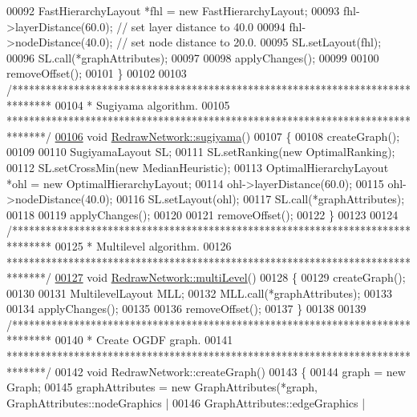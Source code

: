 \begin{DoxyCode}
00092   FastHierarchyLayout *fhl = \textcolor{keyword}{new} FastHierarchyLayout;
00093   fhl->layerDistance(60.0);    \textcolor{comment}{// set layer distance to 40.0}
00094   fhl->nodeDistance(40.0); \textcolor{comment}{// set node distance to 20.0.}
00095   SL.setLayout(fhl);
00096   SL.call(*graphAttributes);
00097 
00098   applyChanges();
00099 
00100   removeOffset();
00101 \}
00102 
00103 \textcolor{comment}{/*******************************************************************************}
00104 \textcolor{comment}{* Sugiyama algorithm.}
00105 \textcolor{comment}{*******************************************************************************/}
\hypertarget{redrawnetwork_8cpp_source_l00106}{}\hyperlink{group___algorithms_gaee0ae606982145e66bba825421d610f8}{00106} \textcolor{keywordtype}{void} \hyperlink{group___algorithms_gaee0ae606982145e66bba825421d610f8}{RedrawNetwork::sugiyama}()
00107 \{
00108   createGraph();
00109 
00110   SugiyamaLayout SL;
00111   SL.setRanking(\textcolor{keyword}{new} OptimalRanking);
00112   SL.setCrossMin(\textcolor{keyword}{new} MedianHeuristic);
00113   OptimalHierarchyLayout *ohl = \textcolor{keyword}{new} OptimalHierarchyLayout;
00114   ohl->layerDistance(60.0);
00115   ohl->nodeDistance(40.0);
00116   SL.setLayout(ohl);
00117   SL.call(*graphAttributes);
00118 
00119   applyChanges();
00120 
00121   removeOffset();
00122 \}
00123 
00124 \textcolor{comment}{/*******************************************************************************}
00125 \textcolor{comment}{* Multilevel algorithm.}
00126 \textcolor{comment}{*******************************************************************************/}
\hypertarget{redrawnetwork_8cpp_source_l00127}{}\hyperlink{group___algorithms_ga56a92ad06ae0198ee60160aa66aa0ce1}{00127} \textcolor{keywordtype}{void} \hyperlink{group___algorithms_ga56a92ad06ae0198ee60160aa66aa0ce1}{RedrawNetwork::multiLevel}()
00128 \{
00129   createGraph();
00130 
00131   MultilevelLayout MLL;
00132   MLL.call(*graphAttributes);
00133 
00134   applyChanges();
00135 
00136   removeOffset();
00137 \}
00138 
00139 \textcolor{comment}{/*******************************************************************************}
00140 \textcolor{comment}{* Create OGDF graph.}
00141 \textcolor{comment}{*******************************************************************************/}
00142 \textcolor{keywordtype}{void} RedrawNetwork::createGraph()
00143 \{
00144   graph = \textcolor{keyword}{new} Graph;
00145   graphAttributes = \textcolor{keyword}{new} GraphAttributes(*graph, GraphAttributes::nodeGraphics |
00146                                         GraphAttributes::edgeGraphics |

\end{DoxyCode}
